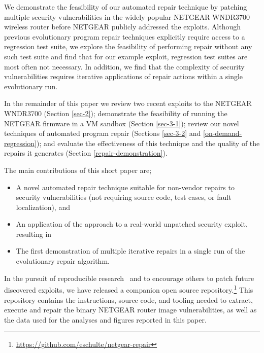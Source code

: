\documentclass{sigcomm-alternate}
\begin{document}

We demonstrate the feasibility of our automated repair technique by
patching multiple security vulnerabilities in the widely popular NETGEAR
WNDR3700 wireless router before NETGEAR publicly addressed the
exploits.  Although previous evolutionary program repair techniques
explicitly require access to a regression test suite, we explore the
feasibility of performing repair without any such test suite and find
that for our example exploit, regression test suites are most often
not necessary. In addition, we find that the complexity of security
vulnerabilities requires iterative applications of repair actions
within a single evolutionary run.

In the remainder of this paper we review two recent exploits to the
NETGEAR WNDR3700 (Section \ref{sec-2}); demonstrate the feasibility
of running the NETGEAR firmware in a VM sandbox (Section \ref{sec-3-1});
review our novel techniques of automated program repair (Sections
\ref{sec-3-2} and \ref{on-demand-regression}); and evaluate the effectiveness of this
technique and the quality of the repairs it generates (Section
\ref{repair-demonstration}).

The main  contributions of this short paper are;
\begin{itemize}
\item A novel automated repair technique suitable for non-vendor repairs to
security vulnerabilities (not requiring source code, test cases, or fault
localization), and 
\item An application of the approach to a real-world unpatched
security exploit, resulting in
\item The first demonstration of multiple iterative repairs in a single
run of the evolutionary repair algorithm.
\end{itemize}

In the pursuit of reproducible
research~\cite{buckheit1995wavelab,mesirov2010accessible} and to encourage
others to patch
future discovered exploits, we have released a companion open source
repository.\footnote{\url{https://github.com/eschulte/netgear-repair}}
This repository contains the instructions, source
code, and tooling needed to extract, execute and repair the binary
NETGEAR router image vulnerabilities, as well as the data used for the
analyses and figures reported  in this paper.

\end{document}
